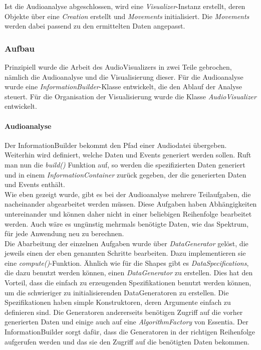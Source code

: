 \documentclass[11pt,a4paper]{article}
\begin{document}
Ist die Audioanalyse abgeschlossen, wird eine \textit{Visualizer}-Instanz erstellt, deren Objekte über eine \textit{Creation} erstellt und \textit{Movements} initialisiert. Die \textit{Movements} werden dabei passend zu den ermittelten Daten angepasst.

\subsubsection{Aufbau}
Prinzipiell wurde die Arbeit des AudioVisualizers in zwei Teile gebrochen, nämlich die Audioanalyse und die Visualisierung dieser. Für die Audioanalyse wurde eine \textit{InformationBuilder}-Klasse entwickelt, die den Ablauf der Analyse steuert. Für die Organisation der Visualisierung wurde die Klasse \textit{AudioVisualizer} entwickelt.
\paragraph{Audioanalyse}
Der InformationBuilder bekommt den Pfad einer Audiodatei übergeben. Weiterhin wird definiert, welche Daten und Events generiert werden sollen. Ruft man nun die \textit{build()} Funktion auf, so werden die spezifizierten Daten generiert und in einem \textit{InformationContainer} zurück gegeben, der die generierten Daten und Events enthält.\\
Wie eben gezeigt wurde, gibt es bei der Audioanalyse mehrere Teilaufgaben, die nacheinander abgearbeitet werden müssen. Diese Aufgaben haben Abhängigkeiten untereinander und können daher nicht in einer beliebigen Reihenfolge bearbeitet werden. Auch wäre es ungünstig mehrmals benötigte Daten, wie das Spektrum, für jede Anwendung neu zu berechnen.\\
Die Abarbeitung der einzelnen Aufgaben wurde über \textit{DataGenerator} gelöst, die jeweils einen der eben genannten Schritte bearbeiten. Dazu implementieren sie eine \textit{compute()}-Funktion. Ähnlich wie für die Shapes gibt es \textit{DataSpecifications}, die dazu benutzt werden können, einen \textit{DataGenerator} zu erstellen. Dies hat den Vorteil, dass die einfach zu erzeugenden Spezifikationen benutzt werden können, um die schwieriger zu initialisierenden DataGeneratoren zu erstellen. Die Spezifikationen haben simple Konstruktoren, deren Argumente einfach zu definieren sind. Die Generatoren andererseits benötigen Zugriff auf die vorher generierten Daten und einige auch auf eine \textit{AlgorithmFactory} von Essentia. Der InformationBuilder sorgt dafür, dass die Generatoren in der richtigen Reihenfolge aufgerufen werden und das sie den Zugriff auf die benötigten Daten bekommen.\\
\end{document}
